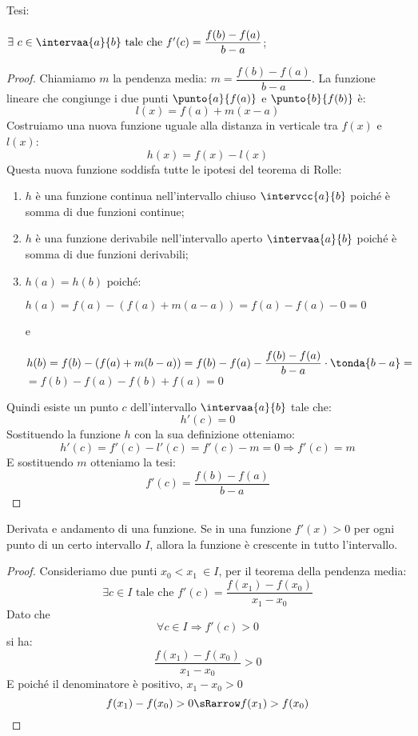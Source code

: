 \noindent Tesi: 

\(\exists~c \in \intervaa{a}{b}\text{ tale che }f'(c)=\dfrac{f(b)-f(a)}{b-a}\);

\begin{proof}
Chiamiamo \(m\) la pendenza media: \(m=\dfrac{f(b)-f(a)}{b-a}\). 
La funzione lineare che congiunge i due 
punti \(\punto{a}{f(a)}\) e \(\punto{b}{f(b)}\) è:
\[l(x) = f(a) + m(x-a)\]
Costruiamo una nuova funzione uguale alla distanza in verticale tra \(f(x)\) 
e \(l(x)\):
\[h(x) = f(x) - l(x)\]
Questa nuova funzione soddisfa tutte le ipotesi del teorema di Rolle:
\begin{enumerate}[nosep]
 \item \(h\) è una funzione continua 
 nell'intervallo chiuso \(\intervcc{a}{b}\)
 poiché è somma di due funzioni continue;
 \item \(h\) è una funzione derivabile 
 nell'intervallo aperto \(\intervaa{a}{b}\)
 poiché è somma di due funzioni derivabili;
 \item \(h(a)=h(b)\)  poiché:
 
 \(h(a)=f(a) - (f(a) + m(a-a))=f(a)-f(a)-0=0\)
 
 e 
 
 \(h(b)=f(b) - (f(a) + m(b-a))=
 f(b)-f(a)-\dfrac{f(b)-f(a)}{b-a}\cdot \tonda{b-a}=\)\\
 \(=f(b)-f(a)-f(b)+f(a)=0\)
\end{enumerate}
 
 Quindi esiste un punto \(c\) dell'intervallo \(\intervaa{a}{b}\) tale che:
 \[h'(c)=0\]
 Sostituendo la funzione \(h\) con la sua definizione otteniamo:
 \[h'(c) = f'(c)-l'(c)= f'(c)-m=0 \Rightarrow f'(c)=m\]
 E sostituendo \(m\) otteniamo la tesi:
 \[f'(c)=\dfrac{f(b)-f(a)}{b-a}\]
\end{proof}

\begin{corollario}
 Derivata e andamento di una funzione. Se in una funzione \(f'(x)>0\) per ogni 
punto di un certo intervallo \(I\), allora la funzione è crescente in tutto 
l'intervallo.
\end{corollario}
% 

\begin{proof}
Consideriamo due punti \(x_0 < x_1 ~ \in I\), 
per il teorema della pendenza media:
\[\exists c \in I \text { tale che } f'(c) = \dfrac{f(x_1)-f(x_0)}{x_1-x_0}\]
Dato che 
\[\forall c \in I \Rightarrow f'(c) > 0\]
si ha:
\[\dfrac{f(x_1)-f(x_0)}{x_1-x_0}>0 \]
E poiché il denominatore è positivo, \(x_1 - x_0 > 0\)
\[f(x_1)-f(x_0)>0 \sRarrow f(x_1)>f(x_0)\]
\end{proof}


